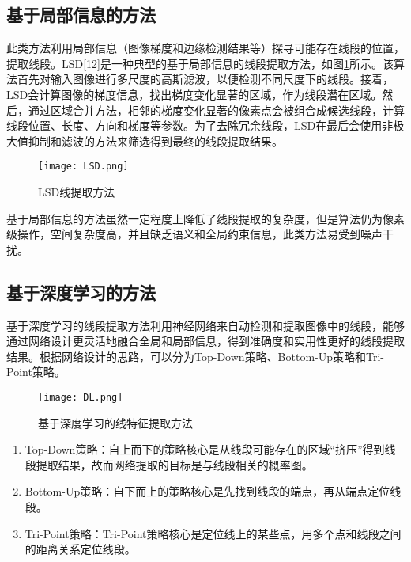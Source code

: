 \subsection{基于局部信息的方法}
此类方法利用局部信息（图像梯度和边缘检测结果等）探寻可能存在线段的位置，提取线段。LSD[12]是一种典型的基于局部信息的线段提取方法，如图\ref{fig_LSD}所示。该算法首先对输入图像进行多尺度的高斯滤波，以便检测不同尺度下的线段。接着，LSD会计算图像的梯度信息，找出梯度变化显著的区域，作为线段潜在区域。然后，通过区域合并方法，相邻的梯度变化显著的像素点会被组合成候选线段，计算线段位置、长度、方向和梯度等参数。为了去除冗余线段，LSD在最后会使用非极大值抑制和滤波的方法来筛选得到最终的线段提取结果。
\begin{figure}
  \centering
  \texttt{[image: LSD.png]}
  \label{fig_LSD}
  \caption{LSD线提取方法}
\end{figure}
基于局部信息的方法虽然一定程度上降低了线段提取的复杂度，但是算法仍为像素级操作，空间复杂度高，并且缺乏语义和全局约束信息，此类方法易受到噪声干扰。

\subsection{基于深度学习的方法}
基于深度学习的线段提取方法利用神经网络来自动检测和提取图像中的线段，能够通过网络设计更灵活地融合全局和局部信息，得到准确度和实用性更好的线段提取结果。根据网络设计的思路，可以分为Top-Down策略、Bottom-Up策略和Tri-Point策略。
\begin{figure}
  \centering
  \texttt{[image: DL.png]}
  \label{fig_DL}
  \caption{基于深度学习的线特征提取方法}
\end{figure}
\begin{enumerate}
  \item Top-Down策略：自上而下的策略核心是从线段可能存在的区域“挤压”得到线段提取结果，故而网络提取的目标是与线段相关的概率图。
  \item Bottom-Up策略：自下而上的策略核心是先找到线段的端点，再从端点定位线段。
  \item Tri-Point策略：Tri-Point策略核心是定位线上的某些点，用多个点和线段之间的距离关系定位线段。
\end{enumerate}

